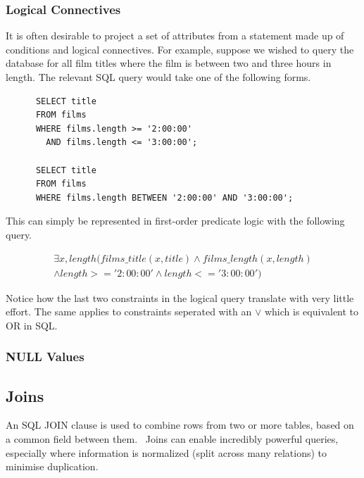 \documentclass[a4paper, 11pt]{article}
\begin{document}
    \subsubsection{Logical Connectives}

      It is often desirable to project a set of attributes from a statement
      made up of conditions and logical connectives. For example, suppose we
      wished to query the database for all film titles where the film is between 
      two and three hours in length. The relevant SQL query would take one of
      the following forms.

      \begin{verbatim}
      SELECT title
      FROM films
      WHERE films.length >= '2:00:00'
        AND films.length <= '3:00:00';

      SELECT title
      FROM films
      WHERE films.length BETWEEN '2:00:00' AND '3:00:00';
      \end{verbatim}

      This can simply be represented in first-order predicate logic with the
      following query.

      \begin{gather}
        \exists x, length(films\_title(x, title) \land films\_length(x,
        length)\\
        \land length >= '2:00:00' \land length <= '3:00:00')
      \end{gather}

      Notice how the last two constraints in the logical query translate
      with very little effort. The same applies to constraints seperated with
      an $\lor$ which is equivalent to OR in SQL.

    \subsubsection{NULL Values}


  \subsection{Joins}
    \label{sec:joins}

    An SQL JOIN clause is used to combine rows from two or more tables, based
    on a common field between them.~\cite{w3JOINS} Joins can enable incredibly
    powerful queries, especially where information
    is normalized (split across many relations) to minimise duplication.
\end{document}
